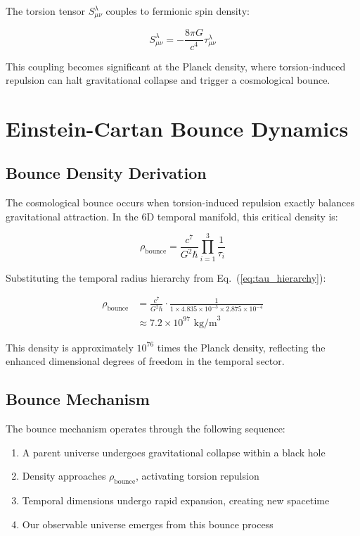 \documentclass[reprint,amsmath,amssymb,aps,prd,nofootinbib,longbibliography]{revtex4-2}
\begin{document}
The torsion tensor $S^\lambda_{\mu\nu}$ couples to fermionic spin density:

\begin{equation}
S^\lambda_{\mu\nu} = -\frac{8\pi G}{c^4} \tau^\lambda_{\mu\nu}
\label{eq:torsion_coupling}
\end{equation}

This coupling becomes significant at the Planck density, where torsion-induced repulsion can halt gravitational collapse and trigger a cosmological bounce.

\section{Einstein-Cartan Bounce Dynamics}

\subsection{Bounce Density Derivation}

The cosmological bounce occurs when torsion-induced repulsion exactly balances gravitational attraction. In the 6D temporal manifold, this critical density is:

\begin{equation}
\boxed{\rho_{\text{bounce}} = \frac{c^7}{G^2\hbar} \prod_{i=1}^{3} \frac{1}{\tau_i}}
\label{eq:bounce_density}
\end{equation}

Substituting the temporal radius hierarchy from Eq.~(\ref{eq:tau_hierarchy}):

\begin{align}
\rho_{\text{bounce}} &= \frac{c^7}{G^2\hbar} \cdot \frac{1}{1 \times 4.835 \times 10^{-3} \times 2.875 \times 10^{-4}} \\
&\approx 7.2 \times 10^{97} \text{ kg/m}^3
\end{align}

This density is approximately $10^{76}$ times the Planck density, reflecting the enhanced dimensional degrees of freedom in the temporal sector.

\subsection{Bounce Mechanism}

The bounce mechanism operates through the following sequence:

\begin{enumerate}
\item A parent universe undergoes gravitational collapse within a black hole
\item Density approaches $\rho_{\text{bounce}}$, activating torsion repulsion
\item Temporal dimensions undergo rapid expansion, creating new spacetime
\item Our observable universe emerges from this bounce process
\end{enumerate}
\end{document}
